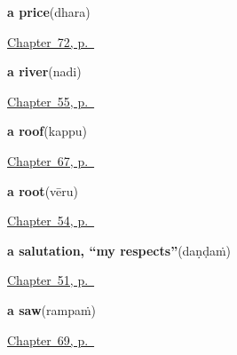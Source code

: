 \noindent\begin{minipage}[t]{\linewidth}
\raggedright
\textbf{a price}\enspace\emph{}\enspace(dhara)\par
\footnotesize \hyperref[ch:te-the-market]{Chapter~72, p.~\pageref*{ch:te-the-market}}
\end{minipage}\par\smallskip

\noindent\begin{minipage}[t]{\linewidth}
\raggedright
\textbf{a river}\enspace\emph{}\enspace(nadi)\par
\footnotesize \hyperref[ch:te-river-road]{Chapter~55, p.~\pageref*{ch:te-river-road}}
\end{minipage}\par\smallskip

\noindent\begin{minipage}[t]{\linewidth}
\raggedright
\textbf{a roof}\enspace\emph{}\enspace(kappu)\par
\footnotesize \hyperref[ch:te-the-house-itself]{Chapter~67, p.~\pageref*{ch:te-the-house-itself}}
\end{minipage}\par\smallskip

\noindent\begin{minipage}[t]{\linewidth}
\raggedright
\textbf{a root}\enspace\emph{}\enspace(vēru)\par
\footnotesize \hyperref[ch:te-tree]{Chapter~54, p.~\pageref*{ch:te-tree}}
\end{minipage}\par\smallskip

\noindent\begin{minipage}[t]{\linewidth}
\raggedright
\textbf{a salutation, \textquotedblleft{}my respects\textquotedblright{}}\enspace\emph{}\enspace(daṇḍaṁ)\par
\footnotesize \hyperref[ch:te-courtesy]{Chapter~51, p.~\pageref*{ch:te-courtesy}}
\end{minipage}\par\smallskip

\noindent\begin{minipage}[t]{\linewidth}
\raggedright
\textbf{a saw}\enspace\emph{}\enspace(rampaṁ)\par
\footnotesize \hyperref[ch:te-tools]{Chapter~69, p.~\pageref*{ch:te-tools}}
\end{minipage}\par\smallskip

